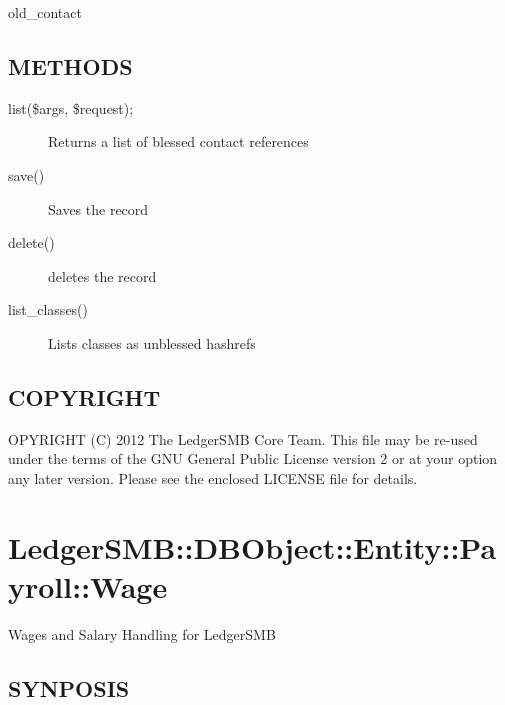 \begin{description}
\begin{description}
\begin{description}
\begin{description}
\begin{description}
\begin{description}
\begin{description}
\begin{description}
\begin{description}
\item[{old\_contact}] \mbox{}\end{description}
\subsection*{METHODS\label{LedgerSMB::DBObject::Entity::Contact_METHODS}}
\begin{description}

\item[{list(\$args, \$request);}] \mbox{}

Returns a list of blessed contact references


\item[{save()}] \mbox{}

Saves the record


\item[{delete()}] \mbox{}

deletes the record


\item[{list\_classes()}] \mbox{}

Lists classes as unblessed hashrefs

\end{description}
\subsection*{COPYRIGHT\label{LedgerSMB::DBObject::Entity::Contact_COPYRIGHT}}


OPYRIGHT (C) 2012 The LedgerSMB Core Team.  This file may be re-used under the
terms of the GNU General Public License version 2 or at your option any later
version.  Please see the enclosed LICENSE file for details.

\section{LedgerSMB::DBObject::Entity::Payroll::Wage\label{LedgerSMB::DBObject::Entity::Payroll::Wage}}


Wages and Salary Handling 
for LedgerSMB

\subsection*{SYNPOSIS\label{LedgerSMB::DBObject::Entity::Payroll::Wage_SYNPOSIS}}



\end{description}
\end{description}
\end{description}
\end{description}
\end{description}
\end{description}
\end{description}
\end{description}
